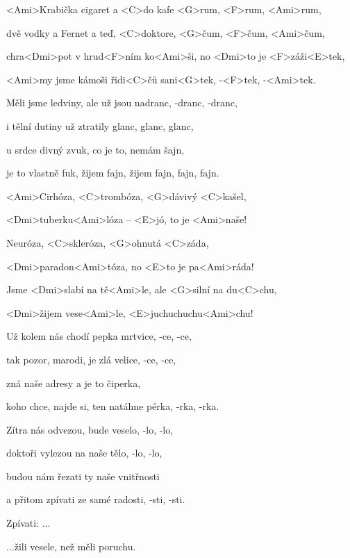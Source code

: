 

\zs
<Ami>Krabička cigaret a <C>do kafe <G>rum, <F>rum, <Ami>rum,

dvě vodky a Fernet a teď, <C>doktore, <G>čum, <F>čum, <Ami>čum,

chra<Dmi>pot v hrud<F>ním ko<Ami>ši, no <Dmi>to je <F>záži<E>tek,

<Ami>my jsme kámoši řidi<C>čů sani<G>tek, -<F>tek, -<Ami>tek.
\ks

\zs
Měli jsme ledviny, ale už jsou nadranc, -dranc, -dranc,

i tělní dutiny už ztratily glanc, glanc, glanc,

u srdce divný zvuk, co je to, nemám šajn,

je to vlastně fuk, žijem fajn, žijem fajn, fajn, fajn.
\ks

\zr
<Ami>Cirhóza, <C>trombóza, <G>dávivý <C>kašel,

<Dmi>tuberku<Ami>lóza -- <E>jó, to je <Ami>naše!

Neuróza, <C>skleróza, <G>ohnutá <C>záda,

<Dmi>paradon<Ami>tóza, no <E>to je pa<Ami>ráda!

Jsme <Dmi>slabí na tě<Ami>le, ale <G>silní na du<C>chu,

<Dmi>žijem vese<Ami>le, <E>juchuchuchu<Ami>chu!
\kr

\zs
Už kolem nás chodí pepka mrtvice, -ce, -ce,

tak pozor, marodi, je zlá velice, -ce, -ce,

zná naše adresy a je to čiperka,

koho chce, najde si, ten natáhne pérka, -rka, -rka.
\ks

\zs
Zítra nás odvezou, bude veselo, -lo, -lo,

doktoři vylezou na naše tělo, -lo, -lo,

budou nám řezati ty naše vnitřnosti

a přitom zpívati ze samé radosti, -sti, -sti.
\ks

\zr
Zpívati: ...

...žili vesele, než měli poruchu.
\kr


\kp





